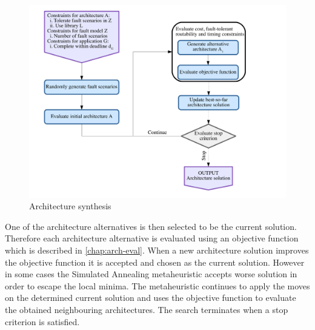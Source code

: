 \begin{figure}[H]
\centering
\includegraphics[scale=0.4]{figures/architecture-synthesis.pdf}
\caption[Architecture synthesis]{Architecture synthesis}
\label{fig:architecture-synthesis}
\end{figure}

One of the architecture alternatives is then selected to be the current solution. Therefore each architecture alternative is evaluated using an objective function which is described in \autoref{chap:arch-eval}. When a new architecture solution improves the objective function it is accepted and chosen as the current solution. However in some cases the Simulated Annealing metaheuristic accepts worse solution in order to escape the local minima. The metaheuristic continues to apply the moves on the determined current solution and uses the objective function to evaluate the obtained neighbouring architectures. The search terminates when a stop criterion is satisfied.\\

